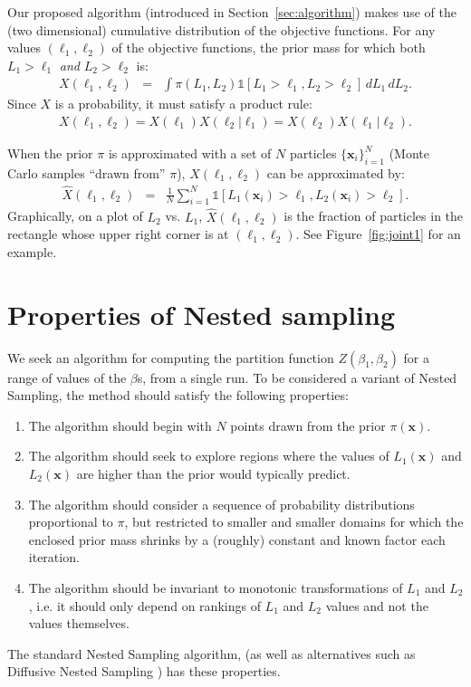 \documentclass[journal,article,accept,moreauthors,pdftex,12pt,a4paper]{mdpi}
\newcommand{\xx}{\boldsymbol{x}}
\begin{document}
Our proposed algorithm (introduced in Section~\ref{sec:algorithm}) makes use
of the (two dimensional) cumulative distribution of the objective functions.
For any values $(\ell_1, \ell_2)$ of the objective functions,
the prior mass for which both $L_1 > \ell_1$ {\em and} $L_2 > \ell_2$ is:
\begin{eqnarray}
X(\ell_1, \ell_2) &=& \int \pi(L_1, L_2)
\mathds{1}\left[L_1 > \ell_1, L_2 > \ell_2 \right]
 \, dL_1 \, dL_2.
\end{eqnarray}
Since $X$ is a probability, it must satisfy a product rule:
\begin{eqnarray}
X(\ell_1, \ell_2) = X(\ell_1)X(\ell_2 | \ell_1) = X(\ell_2)X(\ell_1 | \ell_2).
\end{eqnarray}


When the prior $\pi$ is approximated with a set of $N$
particles $\{\xx_i\}_{i=1}^N$
(Monte Carlo samples ``drawn from'' $\pi$),
$X(\ell_1, \ell_2)$ can be approximated by:
\begin{eqnarray}
\hat{X}(\ell_1, \ell_2) &=&
\frac{1}{N}
\sum_{i=1}^N \mathds{1}\left[L_1(\xx_i) > \ell_1,
L_2(\xx_i) > \ell_2\right].\label{eqn:corner_count}
\end{eqnarray}
Graphically, on a plot of $L_2$ vs. $L_1$, $\hat{X}(\ell_1, \ell_2)$
is the fraction of particles in the rectangle whose upper right corner is at
$\left(\ell_1, \ell_2\right)$. See Figure~\ref{fig:joint1} for an
example.

\section{Properties of Nested sampling}

We seek an algorithm for computing the partition function
$Z(\beta_1, \beta_2)$ for a range of values of the $\beta$s, from a single
run. To be considered a variant of Nested Sampling, the method should satisfy
the following properties:
\begin{enumerate}
\item The algorithm should begin with $N$ points drawn from the prior $\pi(\xx)$.
\item The algorithm should seek to explore regions where the values of
$L_1(\xx)$ and $L_2(\xx)$ are higher than the prior would typically predict.
\item The algorithm should consider a sequence of probability
distributions proportional to $\pi$, but restricted to smaller and smaller
domains for which the enclosed prior mass shrinks by a (roughly) constant and
known factor each iteration.
\item The algorithm should be invariant to monotonic transformations of
$L_1$ and $L_2$, i.e. it should only depend on rankings of $L_1$ and $L_2$
values and not the values themselves.
\end{enumerate}
The standard Nested Sampling algorithm, (as well as alternatives such as
Diffusive Nested Sampling \citep{dnest}) has these properties.
\end{document}
